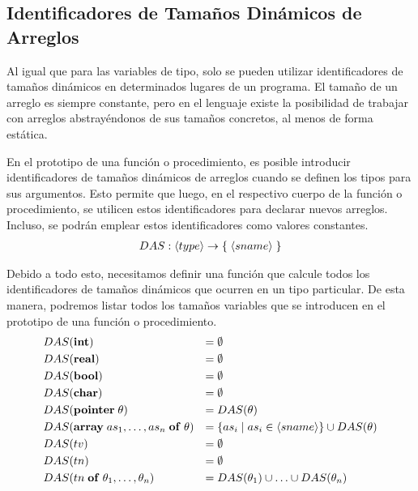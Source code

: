 \subsection{Identificadores de Tamaños Dinámicos de Arreglos}

Al igual que para las variables de tipo, solo se pueden utilizar identificadores de tamaños dinámicos en determinados lugares de un programa.
El tamaño de un arreglo es siempre constante, pero en el lenguaje existe la posibilidad de trabajar con arreglos abstrayéndonos de sus tamaños concretos, al menos de forma estática.

En el prototipo de una función o procedimiento, es posible introducir identificadores de tamaños dinámicos de arreglos cuando se definen los tipos para sus argumentos.
Esto permite que luego, en el respectivo cuerpo de la función o procedimiento, se utilicen estos identificadores para declarar nuevos arreglos.
Incluso, se podrán emplear estos identificadores como valores constantes. %
\begin{gather*}
DAS: \langle type \rangle \rightarrow \{ \; \langle sname \rangle \; \}
\end{gather*}

Debido a todo esto, necesitamos definir una función que calcule todos los identificadores de tamaños dinámicos que ocurren en un tipo particular.
De esta manera, podremos listar todos los tamaños variables que se introducen en el prototipo de una función o procedimiento.
\begin{align*}
&DAS(\mathbf{int})
&=&\;
\emptyset
\\
&DAS(\mathbf{real})
&=&\;
\emptyset
\\
&DAS(\mathbf{bool})
&=&\;
\emptyset
\\
&DAS(\mathbf{char})
&=&\;
\emptyset
\\
&DAS(\mathbf{pointer} \; \theta)
&=&\;
DAS(\theta)
\\
&DAS(\mathbf{array} \; as_1, \ldots, as_n \; \mathbf{of} \; \theta)
&=&\;
\{ as_i \mid as_i \in \langle sname \rangle \} \cup DAS(\theta)
\\
&DAS(tv)
&=&\;
\emptyset
\\
&DAS(tn)
&=&\;
\emptyset
\\
&DAS(tn \; \mathbf{of} \; \theta_1, \ldots, \theta_n)
&=&\;
DAS(\theta_1) \cup \ldots \cup DAS(\theta_n)
\end{align*}

